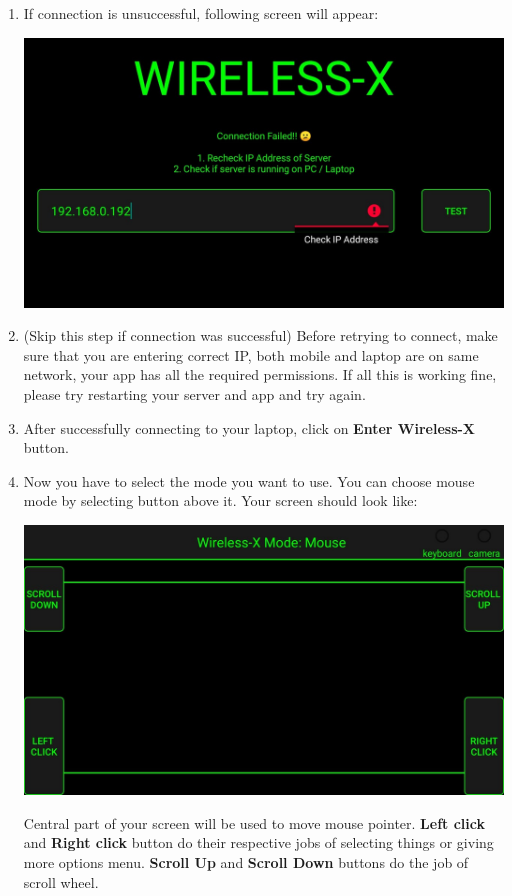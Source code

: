 \documentclass[12pt, letterpaper]{article}
\begin{document}
\begin{enumerate}
\begin{center}
\end{center}
\item If connection is unsuccessful, following screen will appear:
\begin{center}
    \includegraphics[scale=0.25]{images/connectionFailed.jpeg}
\end{center}
\item (Skip this step if connection was successful) Before retrying to connect, make sure that you are entering correct IP, both mobile and laptop are on same network, your app has all the required permissions. If all this is working fine, please try restarting your server and app and try again.
\item After successfully connecting to your laptop, click on \textbf{Enter Wireless-X} button. 
\item Now you have to select the mode you want to use. You can choose mouse mode by selecting button above it. Your screen should look like:
\begin{center}
    \includegraphics[scale=0.25]{images/mouse.jpeg}
\end{center}
Central part of your screen will be used to move mouse pointer. \textbf{Left click} and \textbf{Right click} button do their respective jobs of selecting things or giving more options menu. \textbf{Scroll Up} and \textbf{Scroll Down} buttons do the job of scroll wheel.

\end{enumerate}
\end{document}

